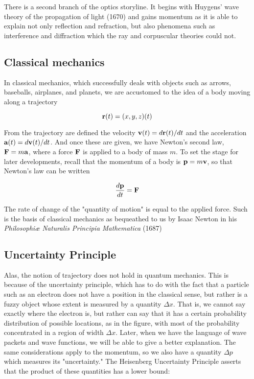 There is a second branch of the optics storyline.  It begins with Huygens' wave theory of the propagation of light (1670) and gains momentum as it is able to explain not only reflection and refraction, but also phenomena such as interference and diffraction which the ray and corpuscular theories could not.

\subsection{Classical mechanics}

In classical mechanics, which successfully deals with objects such as arrows, baseballs, airplanes, and planets, we are accustomed to the idea of a body moving along a trajectory

\begin{equation}
{\bf r}(t) = (x,y,z)(t)
\end{equation}


From the trajectory are defined the velocity ${\bf v}(t) = d{\bf r}(t)/dt$ and the acceleration ${\bf a}(t) = d{\bf v}(t)/dt$.  And once these are given, we have Newton's second law, ${\bf F} = m{\bf a}$, where a force ${\bf F}$ is applied to a body of mass $m$. To set the stage for later developments, recall that the momentum of a body is ${\bf p} = m{\bf v}$, so that Newton's law can be written

\begin{equation}
\frac{d{\bf p}}{dt} = {\bf F}
\end{equation}

The rate of change of the "quantity of motion" is equal to the applied force.  Such is the basis of classical mechanics as bequeathed to us by Isaac Newton in his \emph{Philosophiæ Naturalis Principia Mathematica} (1687)

\subsection{Uncertainty Principle}

Alas, the notion of trajectory does not hold in quantum mechanics.  This is because of the uncertainty principle, which has to do with the fact that a particle such as an electron does not have a position in the classical sense, but rather is a fuzzy object whose extent is measured by a quantity $\Delta x$. That is, we cannot say exactly where the electron is, but rather can say that it has a certain probability distribution of possible locations, as in the figure, with most of the probability concentrated in a region of width $\Delta x$.  Later, when we have the language of wave packets and wave functions,  we will be able to give a better explanation.  The same considerations apply to the momentum, so we also have a quantity $\Delta p$ which measures its "uncertainty."  The Heisenberg Uncertainty Principle asserts that the product of these quantities has a lower bound:




